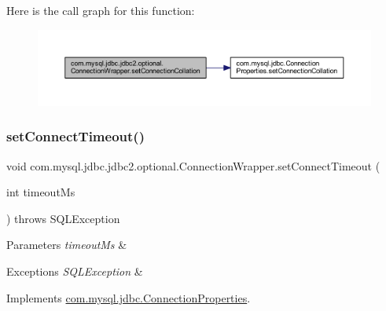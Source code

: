 Here is the call graph for this function\+:
\nopagebreak
\begin{figure}[H]
\begin{center}
\leavevmode
\includegraphics[width=350pt]{classcom_1_1mysql_1_1jdbc_1_1jdbc2_1_1optional_1_1_connection_wrapper_a663eda436c1079c803042e8496d17549_cgraph}
\end{center}
\end{figure}
\mbox{\label{classcom_1_1mysql_1_1jdbc_1_1jdbc2_1_1optional_1_1_connection_wrapper_aba78fb901b9a9d79b7432393b49febf0}} 
\subsubsection{\texorpdfstring{set\+Connect\+Timeout()}{setConnectTimeout()}}
{\footnotesize\ttfamily void com.\+mysql.\+jdbc.\+jdbc2.\+optional.\+Connection\+Wrapper.\+set\+Connect\+Timeout (\begin{DoxyParamCaption}\item[{int}]{timeout\+Ms }\end{DoxyParamCaption}) throws S\+Q\+L\+Exception}


\begin{DoxyParams}{Parameters}
{\em timeout\+Ms} & \\
\hline
\end{DoxyParams}

\begin{DoxyExceptions}{Exceptions}
{\em S\+Q\+L\+Exception} & \\
\hline
\end{DoxyExceptions}


Implements \mbox{\hyperlink{interfacecom_1_1mysql_1_1jdbc_1_1_connection_properties_af58263721d45c09ec3bdbccc1041e1df}{com.\+mysql.\+jdbc.\+Connection\+Properties}}.

